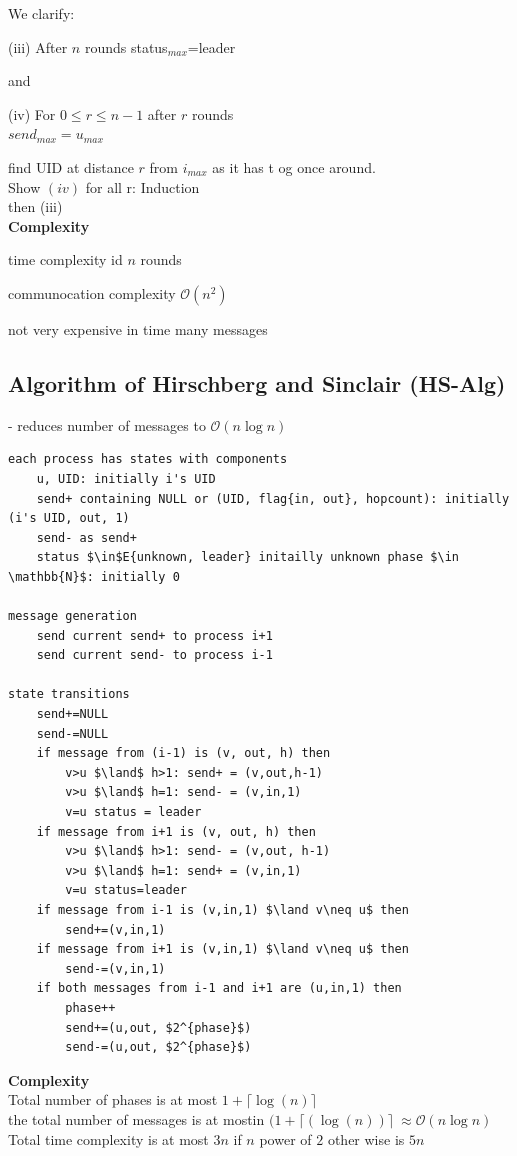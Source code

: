 We clarify:\\
\begin{compactitem}
\item[(iii)] After $n$ rounds status$_{max}$=leader
\end{compactitem}
and\\
\begin{compactitem}
\item[(iv)] For $0\leq r\leq n-1$ after $r$ rounds\\
	$send_{max}=u_{max}$
\end{compactitem}
find UID at distance $r$ from $i_{max}$ as it has t og once around.\\

Show $(iv)$ for all r: Induction\\
then (iii)\\

\textbf{Complexity}\\
\begin{compactitem}
\item time complexity id $n$ rounds
\item communocation complexity $\mathcal{O}(n^2)$
\item not very expensive in time many messages

\end{compactitem}

\subsection{Algorithm of Hirschberg and Sinclair (HS-Alg)}
- reduces number of messages to $\mathcal{O}(n \log n)$\\

\begin{lstlisting}
each process has states with components
	u, UID: initially i's UID
	send+ containing NULL or (UID, flag{in, out}, hopcount): initially (i's UID, out, 1)
	send- as send+
	status $\in$E{unknown, leader} initailly unknown phase $\in \mathbb{N}$: initially 0

message generation
	send current send+ to process i+1
	send current send- to process i-1

state transitions
	send+=NULL
	send-=NULL
	if message from (i-1) is (v, out, h) then
		v>u $\land$ h>1: send+ = (v,out,h-1)
		v>u $\land$ h=1: send- = (v,in,1)
		v=u status = leader
	if message from i+1 is (v, out, h) then
		v>u $\land$ h>1: send- = (v,out, h-1)
		v>u $\land$ h=1: send+ = (v,in,1)
		v=u status=leader
	if message from i-1 is (v,in,1) $\land v\neq u$ then
		send+=(v,in,1)
	if message from i+1 is (v,in,1) $\land v\neq u$ then
		send-=(v,in,1)
	if both messages from i-1 and i+1 are (u,in,1) then
		phase++
		send+=(u,out, $2^{phase}$)
		send-=(u,out, $2^{phase}$)
\end{lstlisting}
\textbf{Complexity}\\
Total number of phases is at most $1+\lceil\log(n)\rceil$\\
the total number of messages is at mostin $(1+\lceil(\log(n))\rceil\ \approx \mathcal{O}(n\log n)$\\
Total time complexity is at most $3n$ if $n$ power of $2$ other wise is $5n$\\

